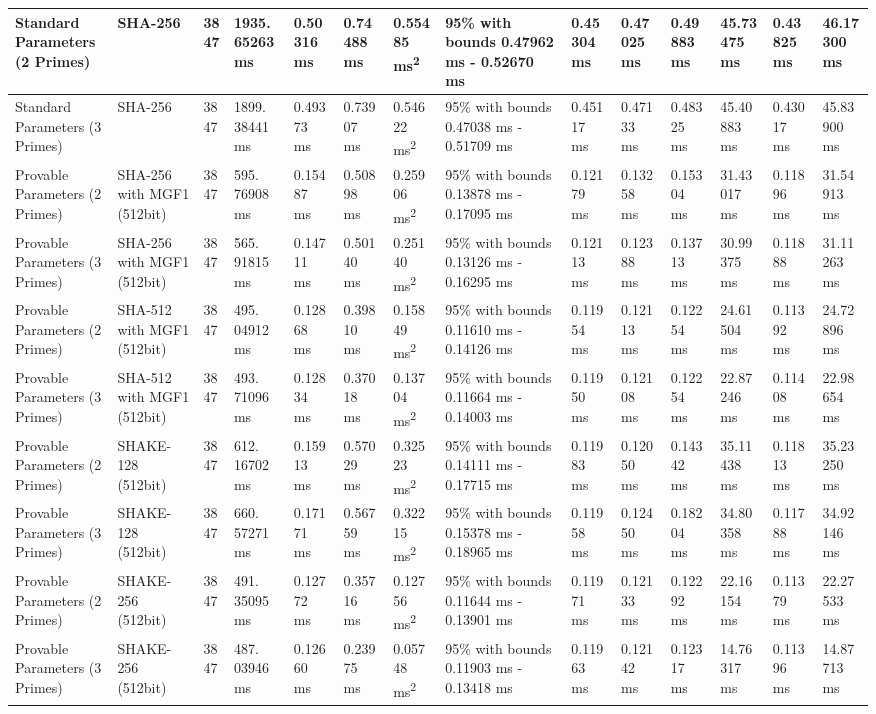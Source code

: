 \documentclass[]{final_report}
\theoremstyle{definition}
\begin{document}
\begin{landscape}
\begin{longtable}{|p{2.3cm}|p{1.8cm}|p{1.0cm}|p{1.7cm}|p{1.4cm}|p{1.5cm}|p{1.8cm}|p{1.5cm}|p{1.43cm}|p{1.5cm}|p{1.3cm}|p{1.4cm}|p{1.3cm}|p{1.3cm}|}
Standard Parameters (2 Primes) & SHA-256 & 3847 & 1935.
65263 ms & 0.50316 ms & 0.74488 ms & 0.55485 ms\textsuperscript{2} & 95\% with bounds 0.47962 ms - 0.52670 ms & 0.45304 ms & 0.47025 ms & 0.49883 ms & 45.73475 ms & 0.43825 ms & 46.17300 ms \\
\hline
Standard Parameters (3 Primes) & SHA-256 & 3847 & 1899.
38441 ms & 0.49373 ms & 0.73907 ms & 0.54622 ms\textsuperscript{2} & 95\% with bounds 0.47038 ms - 0.51709 ms & 0.45117 ms & 0.47133 ms & 0.48325 ms & 45.40883 ms & 0.43017 ms & 45.83900 ms \\
\hline
Provable Parameters (2 Primes) & SHA-256 with MGF1 (512bit) & 3847 & 595.
76908 ms & 0.15487 ms & 0.50898 ms & 0.25906 ms\textsuperscript{2} & 95\% with bounds 0.13878 ms - 0.17095 ms & 0.12179 ms & 0.13258 ms & 0.15304 ms & 31.43017 ms & 0.11896 ms & 31.54913 ms \\
\hline
Provable Parameters (3 Primes) & SHA-256 with MGF1 (512bit) & 3847 & 565.
91815 ms & 0.14711 ms & 0.50140 ms & 0.25140 ms\textsuperscript{2} & 95\% with bounds 0.13126 ms - 0.16295 ms & 0.12113 ms & 0.12388 ms & 0.13713 ms & 30.99375 ms & 0.11888 ms & 31.11263 ms \\
\hline
Provable Parameters (2 Primes) & SHA-512 with MGF1 (512bit) & 3847 & 495.
04912 ms & 0.12868 ms & 0.39810 ms & 0.15849 ms\textsuperscript{2} & 95\% with bounds 0.11610 ms - 0.14126 ms & 0.11954 ms & 0.12113 ms & 0.12254 ms & 24.61504 ms & 0.11392 ms & 24.72896 ms \\
\hline
Provable Parameters (3 Primes) & SHA-512 with MGF1 (512bit) & 3847 & 493.
71096 ms & 0.12834 ms & 0.37018 ms & 0.13704 ms\textsuperscript{2} & 95\% with bounds 0.11664 ms - 0.14003 ms & 0.11950 ms & 0.12108 ms & 0.12254 ms & 22.87246 ms & 0.11408 ms & 22.98654 ms \\
\hline
Provable Parameters (2 Primes) & SHAKE-128 (512bit) & 3847 & 612.
16702 ms & 0.15913 ms & 0.57029 ms & 0.32523 ms\textsuperscript{2} & 95\% with bounds 0.14111 ms - 0.17715 ms & 0.11983 ms & 0.12050 ms & 0.14342 ms & 35.11438 ms & 0.11813 ms & 35.23250 ms \\
\hline
Provable Parameters (3 Primes) & SHAKE-128 (512bit) & 3847 & 660.
57271 ms & 0.17171 ms & 0.56759 ms & 0.32215 ms\textsuperscript{2} & 95\% with bounds 0.15378 ms - 0.18965 ms & 0.11958 ms & 0.12450 ms & 0.18204 ms & 34.80358 ms & 0.11788 ms & 34.92146 ms \\
\hline
Provable Parameters (2 Primes) & SHAKE-256 (512bit) & 3847 & 491.
35095 ms & 0.12772 ms & 0.35716 ms & 0.12756 ms\textsuperscript{2} & 95\% with bounds 0.11644 ms - 0.13901 ms & 0.11971 ms & 0.12133 ms & 0.12292 ms & 22.16154 ms & 0.11379 ms & 22.27533 ms \\
\hline
Provable Parameters (3 Primes) & SHAKE-256 (512bit) & 3847 & 487.
03946 ms & 0.12660 ms & 0.23975 ms & 0.05748 ms\textsuperscript{2} & 95\% with bounds 0.11903 ms - 0.13418 ms & 0.11963 ms & 0.12142 ms & 0.12317 ms & 14.76317 ms & 0.11396 ms & 14.87713 ms \\
\hline


\end{longtable}
\end{landscape}
\end{document}
